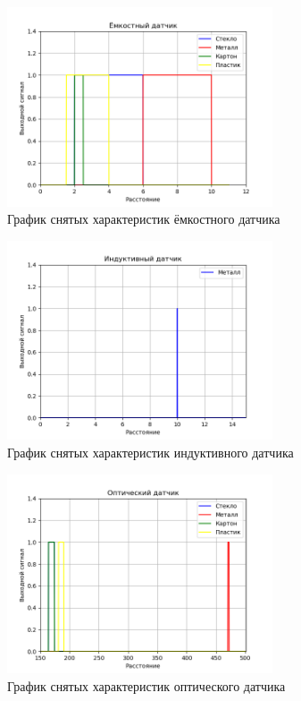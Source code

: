 \documentclass[a4paper]{article}
\begin{document}
\begin{figure}[H]
    \centering
    \includegraphics[width=0.7\textwidth]{plot_1.png}
    \caption{График снятых характеристик ёмкостного датчика}
    \label{fig:csn}
\end{figure}
\begin{figure}[H]
    \centering
    \includegraphics[width=0.7\textwidth]{plot_2.png}
    \caption{График снятых характеристик индуктивного датчика}
    \label{fig:isn}
\end{figure}
\begin{figure}[H]
    \centering
    \includegraphics[width=0.7\textwidth]{plot_3.png}
    \caption{График снятых характеристик оптического датчика}
    \label{fig:ovn}
\end{figure}
\end{document}
